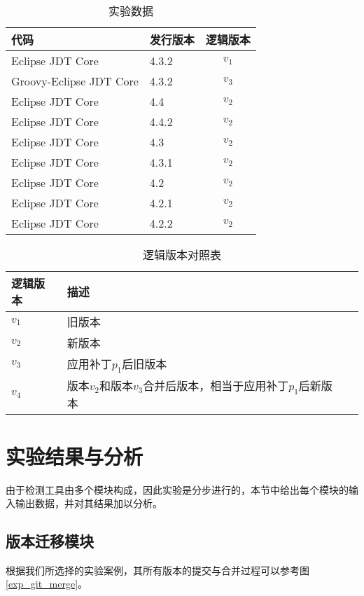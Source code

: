 \begin{table}
	\caption{实验数据}
	\label{exp_data}
	\centering
	\begin{tabular}{llc}
		\toprule[1.5pt]
		{\heiti 代码} & {\heiti 发行版本} & {\heiti 逻辑版本} \\\midrule[1pt]
		Eclipse JDT Core & 4.3.2 & $v_1$ \\
		Groovy-Eclipse JDT Core & 4.3.2 & $v_3$\\
		Eclipse JDT Core & 4.4 & $v_2$\\
		Eclipse JDT Core & 4.4.2 & $v_2$\\
		Eclipse JDT Core & 4.3 & $v_2$\\
		Eclipse JDT Core & 4.3.1 & $v_2$\\
		Eclipse JDT Core & 4.2 & $v_2$\\
		Eclipse JDT Core & 4.2.1 & $v_2$\\
		Eclipse JDT Core & 4.2.2 & $v_2$\\
		\bottomrule[1.5pt]
	\end{tabular}
\end{table}

\begin{table}
	\caption{逻辑版本对照表}
	\label{exp_version}
	\centering
	\begin{tabular}{llc}
		\toprule[1.5pt]
		{\heiti 逻辑版本} & {\heiti 描述} \\\midrule[1pt]
		$v_1$ & 旧版本 \\
		$v_2$ & 新版本\\
		$v_3$ & 应用补丁$p_1$后旧版本\\
		$v_4$ & 版本$v_2$和版本$v_3$合并后版本，相当于应用补丁$p_1$后新版本\\
		\bottomrule[1.5pt]
	\end{tabular}
\end{table}

\section{实验结果与分析}
\label {exp_result}

由于检测工具由多个模块构成，因此实验是分步进行的，本节中给出每个模块的输入输出数据，并对其结果加以分析。
\subsection{版本迁移模块}

根据我们所选择的实验案例，其所有版本的提交与合并过程可以参考图\ref {exp_git_merge}。

